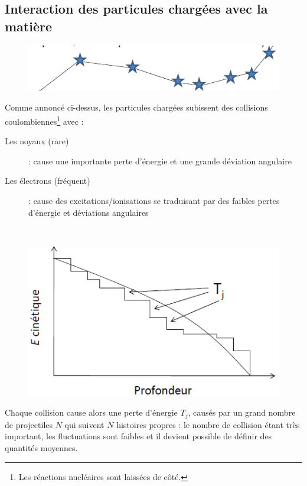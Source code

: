\newpage
\subsection{Interaction des particules chargées avec la matière}
	\begin{figure}
	\vspace{2mm}
	\includegraphics[scale=0.4]{ch1/image1.png}
	\end{figure}
Comme annoncé ci-dessus, les particules chargées subissent des collisions 
coulombiennes\footnote{Les réactions nucléaires sont laissées de côté.} avec :
\begin{description}
\item[Les noyaux (rare)] : cause une importante perte d'énergie et une grande déviation
angulaire
\item[Les électrons (fréquent)] : cause des excitations/ionisations se traduisant par des
faibles pertes d'énergie et déviations angulaires
\end{description}\ \\

	\begin{figure}
	\vspace{-9mm}
	\includegraphics[scale=0.4]{ch1/image2.png}
	\end{figure}
Chaque collision cause alors une perte d'énergie $T_j$, causés par un grand nombre de 
projectiles $N$ qui suivent $N$ histoires propres : le nombre de collision étant très 
important, les fluctuations sont faibles et il devient possible de définir des quantités
moyennes.\\

